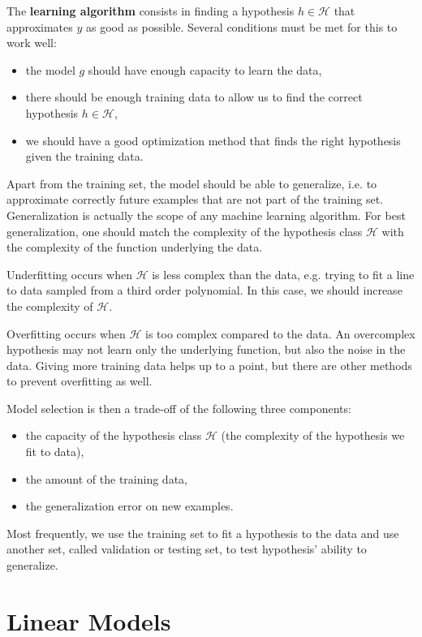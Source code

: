 \documentclass[a4paper,11pt]{report}
\begin{document}
The \textbf{learning algorithm} consists in finding a hypothesis $h \in \mathcal{H}$ that approximates $y$ as good as possible. Several conditions must be met for this to work well:
\begin{itemize}
  \item the model $g$ should have enough capacity to learn the data,
  \item there should be enough training data to allow us to find the correct hypothesis $h \in \mathcal{H}$,
  \item we should have a good optimization method that finds the right hypothesis given the training data.
\end{itemize}

Apart from the training set, the model should be able to generalize, i.e. to approximate correctly future examples that are not part of the training set. Generalization is actually the scope of any machine learning algorithm. For best generalization, one should match the complexity of the hypothesis class $\mathcal{H}$ with the complexity of the function underlying the data. 

Underfitting occurs when $\mathcal{H}$ is less complex than the data, e.g. trying to fit a line to data sampled from a third order polynomial. In this case, we should increase the complexity of $\mathcal{H}$.

Overfitting occurs when $\mathcal{H}$ is too complex compared to the data. An overcomplex hypothesis may not learn only the underlying function, but also the noise in the data. Giving more training data helps up to a point, but there are other methods to prevent overfitting as well. 

Model selection is then a trade-off of the following three components:
\begin{itemize}
  \item the capacity of the hypothesis class $\mathcal{H}$ (the complexity of the hypothesis we fit to data),
  \item the amount of the training data, 
  \item the generalization error on new examples. 
\end{itemize}

Most frequently, we use the training set to fit a hypothesis to the data and use another set, called validation or testing set, to test hypothesis' ability to generalize. 


\chapter{Linear Models}
\end{document}
